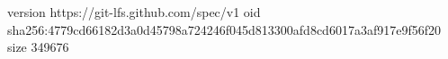 version https://git-lfs.github.com/spec/v1
oid sha256:4779cd66182d3a0d45798a724246f045d813300afd8cd6017a3af917e9f56f20
size 349676
